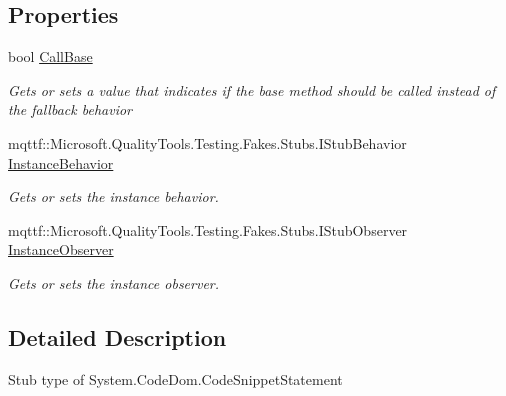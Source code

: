 \subsection*{Properties}
\begin{DoxyCompactItemize}
\item 
bool \hyperlink{class_system_1_1_code_dom_1_1_fakes_1_1_stub_code_snippet_statement_a65323896fee82dcb6f291a79d29a6192}{Call\-Base}
\begin{DoxyCompactList}\small\item\em Gets or sets a value that indicates if the base method should be called instead of the fallback behavior\end{DoxyCompactList}\item 
mqttf\-::\-Microsoft.\-Quality\-Tools.\-Testing.\-Fakes.\-Stubs.\-I\-Stub\-Behavior \hyperlink{class_system_1_1_code_dom_1_1_fakes_1_1_stub_code_snippet_statement_a2c2254e725175f281eb1570022828fd3}{Instance\-Behavior}
\begin{DoxyCompactList}\small\item\em Gets or sets the instance behavior.\end{DoxyCompactList}\item 
mqttf\-::\-Microsoft.\-Quality\-Tools.\-Testing.\-Fakes.\-Stubs.\-I\-Stub\-Observer \hyperlink{class_system_1_1_code_dom_1_1_fakes_1_1_stub_code_snippet_statement_a84678f4611b60f0dbd0ab10fb7a539fd}{Instance\-Observer}
\begin{DoxyCompactList}\small\item\em Gets or sets the instance observer.\end{DoxyCompactList}\end{DoxyCompactItemize}


\subsection{Detailed Description}
Stub type of System.\-Code\-Dom.\-Code\-Snippet\-Statement



